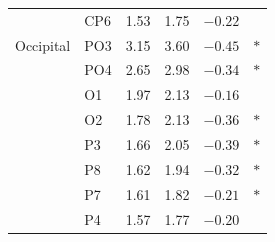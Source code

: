 \documentclass[journal,twoside,web]{ieeecolor}
\begin{document}
\begin{table}[htbp]
\begin{tabular}{@{}llrrrc@{}}
     & CP6 & 1.53 & 1.75 & $-0.22$ & \\
    \addlinespace
    Occipital & PO3 & 3.15 & 3.60 & $-0.45$ & $*$ \\
     & PO4 & 2.65 & 2.98 & $-0.34$ & $*$ \\
     & O1 & 1.97 & 2.13 & $-0.16$ & \\
     & O2 & 1.78 & 2.13 & $-0.36$ & $*$ \\
     & P3 & 1.66 & 2.05 & $-0.39$ & $*$ \\
     & P8 & 1.62 & 1.94 & $-0.32$ & $*$ \\
     & P7 & 1.61 & 1.82 & $-0.21$ & $*$ \\
     & P4 & 1.57 & 1.77 & $-0.20$ & \\
    \bottomrule
  \end{tabular}
\end{table}
\end{document}

